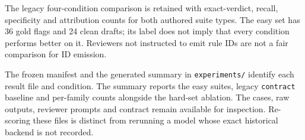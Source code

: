 \documentclass[
  10pt,
  a4paper,
]{article}
\begin{document}
The legacy four-condition comparison is retained with exact-verdict,
recall, specificity and attribution counts for both authored suite
types. The easy set has 36 gold flags and 24 clean drafts; its label
does not imply that every condition performs better on it. Reviewers not
instructed to emit rule IDs are not a fair comparison for ID emission.

The frozen manifest and the generated summary in \texttt{experiments/}
identify each result file and condition. The summary reports the easy
suites, legacy \texttt{contract} baseline and per-family counts
alongside the hard-set ablation. The cases, raw outputs, reviewer
prompts and contract remain available for inspection. Re-scoring these
files is distinct from rerunning a model whose exact historical backend
is not recorded.
\end{document}
